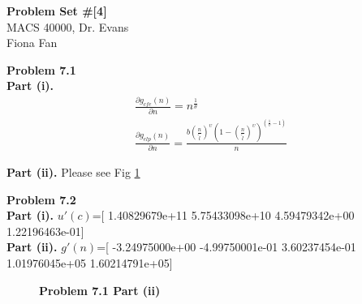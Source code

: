 \documentclass[letterpaper,12pt]{article}
\theoremstyle{definition}
\begin{document}
\begin{flushleft}
  \textbf{\large{Problem Set \#[4]}} \\
  MACS 40000, Dr. Evans \\
  Fiona Fan
\end{flushleft}

\vspace{5mm}

\noindent\textbf{Problem 7.1}
\\ \textbf{Part (i).} 
\begin{align}
\frac{\partial g_{cfe}(n)}{\partial n}=n^{\frac{1}{\theta}}\\
\frac{\partial g_{elp}(n)}{\partial n}=\frac{b (\frac{n}{\tilde{l}})^\upsilon (1-(\frac{n}{\tilde{l}})^\upsilon)^{(\frac{1}{\upsilon}-1)}}{n}
\end{align}

\textbf{Part (ii).} Please see Fig \ref{Fig1}

\noindent\textbf{Problem 7.2}
\\ \textbf{Part (i).} $u'(c)$=[  1.40829679e+11   5.75433098e+10   4.59479342e+00   1.22196463e-01]
\\ \textbf{Part (ii).} $g'(n)$=[ -3.24975000e+00  -4.99750001e-01   3.60237454e-01   1.01976045e+05
1.60214791e+05] 

\begin{figure}[htb]
	\centering
	\captionsetup{width=4.0in}
	\caption{\textbf{Problem 7.1 Part (ii)}}
	\label{Fig1}
	
\end{figure}
\end{document}
